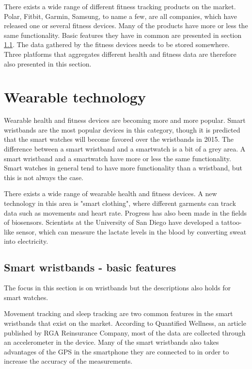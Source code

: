 \documentclass{cslthse-msc}
\begin{document}
There exists a wide range of different fitness tracking products on the market. Polar, Fitbit, Garmin, Samsung, to name a few, are all companies, which have released one or several fitness devices. Many of the products have more or less the same functionality. Basic features they have in common are presented in section \ref{sec:Wearable}. The data gathered by the fitness devices needs to be stored somewhere. Three platforms that aggregates different health and fitness data are therefore also presented in this section.

\section{Wearable technology}

Wearable health and fitness devices are becoming more and more popular. Smart wristbands are the most popular devices  in this category, though it is predicted that the smart watches will become favored over the wristbands in 2015\cite{gartner}. The difference between a smart wristband and a smartwatch is a bit of a grey area. A smart wristband and a smartwatch have more or less the same functionality. Smart watches in general tend to have more functionality than a wristband, but this is not always the case. 

There exists a wide range of wearable health and fitness devices. A new technology in this area is "smart clothing", where different garments can track data such as movements and heart rate\cite{callaway2015quantified}. Progress has also been made in the fields of biosensors. Scientists at the University of San Diego have developed a tattoo-like sensor, which can measure the lactate levels in the blood by converting sweat into electricity\cite{tattoo-device}.



\subsection{Smart wristbands - basic features}
\label{sec:Wearable}
The focus in this section is on wristbands but the descriptions also holds for smart watches.

Movement tracking and sleep tracking are two common features in the smart wristbands that exist on the market. According to Quantified Wellness, an article published by RGA Reinsurance Company\cite{callaway2015quantified}, most of the data are collected through an accelerometer in the device. Many of the smart wristbands also takes advantages of the GPS in the smartphone they are connected to in order to increase the accuracy of the measurements.
\end{document}
